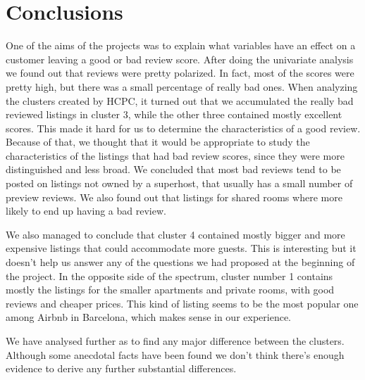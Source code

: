 

\section{Conclusions}%
\label{sec:conclusions}

One of the aims of the projects was to explain what variables have an effect on a customer leaving a good or bad review score. After doing the univariate analysis we found out that reviews were pretty polarized.  In fact, most of the scores were pretty high, but there was a small percentage of really bad ones. When analyzing the clusters created by HCPC, it turned out that we accumulated the really bad reviewed listings in cluster 3, while the other three contained mostly excellent scores. This made it hard for us to determine the characteristics of a good review. Because of that, we thought that it would be appropriate to study the characteristics of the listings that had bad review scores, since they were more distinguished and less broad. We concluded that most bad reviews tend to be posted on listings not owned by a superhost, that usually has a small number of preview reviews. We also found out that listings for shared rooms where more likely to end up having a bad review.

We also managed to conclude that cluster 4 contained mostly bigger and more expensive listings that could accommodate more guests. This is interesting but it doesn't help us answer any of the questions we had proposed at the beginning of the project.
In the opposite side of the spectrum,  cluster number 1 contains mostly the listings for the smaller apartments and private rooms, with good reviews and cheaper prices. This kind of listing seems to be the most popular one among Airbnb in Barcelona, which makes sense in our experience.

We have analysed further as to find any major difference between the clusters. Although some anecdotal facts have been found we don't think there's enough evidence to derive any further substantial differences.